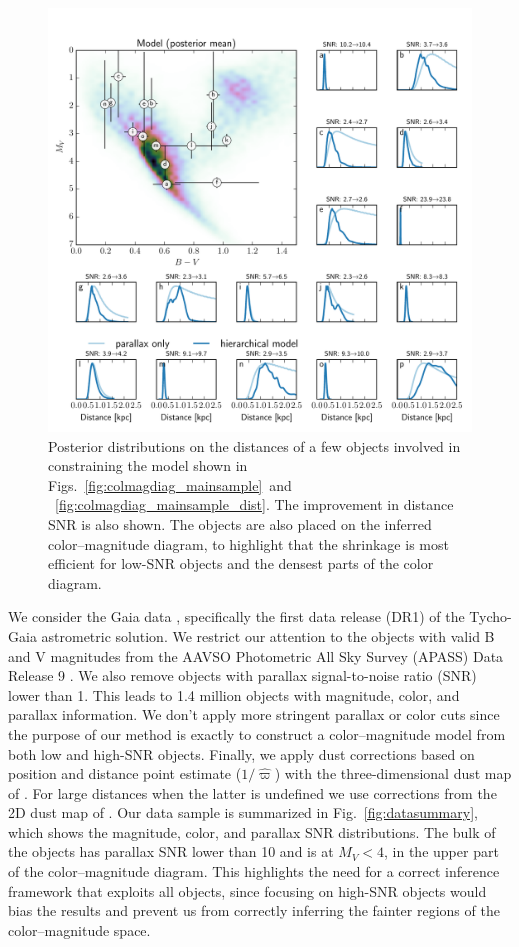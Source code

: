 \documentclass[manuscript, letterpaper]{aastex6}
\newcommand{\figref}[1]{{\xspace}Fig.~\ref{#1}}
\newcommand{\figrefs}[2]{{\xspace}Figs.~\ref{#1}~and ~\ref{#2}}
\begin{document}
\begin{figure}
\hspace*{-2mm}\includegraphics[width=15.7cm]{model_dist_pdfs.pdf}
\caption{Posterior distributions on the distances of a few objects involved in constraining the model shown in \figrefs{fig:colmagdiag_mainsample}{fig:colmagdiag_mainsample_dist}. 
The improvement in distance SNR is also shown. The objects are also placed on the inferred color--magnitude diagram, to highlight that the shrinkage is most efficient for low-SNR objects and the densest parts of the color diagram.}\label{fig:model_dist_pdfs}
\end{figure}

We consider the Gaia data \citep{gaia}, specifically the first data release (DR1) of the Tycho-Gaia astrometric solution\citep[hereafter TGAS][]{gaia_dr1}.
We restrict our attention to the objects with valid B and V magnitudes from the AAVSO Photometric All Sky Survey (APASS) Data Release 9 \citep{munari2014, hendenmunari2014}. 
We also remove objects with parallax signal-to-noise ratio (SNR) lower than 1. 
This leads to 1.4 million objects with magnitude, color, and parallax information. 
We don't apply more stringent parallax or color cuts since the purpose of our method is exactly to construct a color--magnitude model from both low and high-SNR objects. 
Finally, we apply dust corrections based on position and distance point estimate ($1/\hat{\varpi}$) with the three-dimensional dust map of \cite{Green2015bayestar}. 
For large distances when the latter is undefined we use corrections from the 2D dust map of \cite{sfd1998}.
Our data sample is summarized in \figref{fig:datasummary}, which shows the magnitude, color, and parallax SNR distributions.
The bulk of the objects has parallax SNR lower than 10 and is at $M_V  < 4$, in the upper part of the color--magnitude diagram.
This highlights the need for a correct inference framework that exploits all objects, since focusing on high-SNR objects would bias the results and prevent us from correctly inferring the fainter regions of the color--magnitude space.
\end{document}
